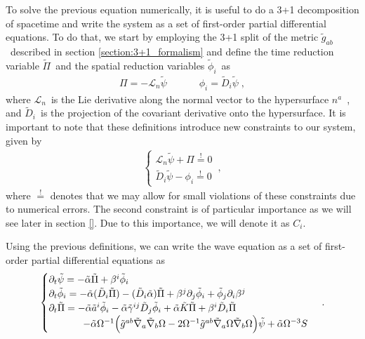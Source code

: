 To solve the previous equation numerically, it is useful to do a 3+1 decomposition of spacetime and write the system as a set of first-order partial differential equations. To do that, we start by employing the 3+1 split of the metric $\tilde{g}_{ab}$~described in section \ref{section:3+1_formalism} and define the time reduction variable $\tilde{\Pi}$~and the spatial reduction variables $\tilde{\phi}_i$~as
%
\begin{align}
    \Pi = - \mathcal{L}_n \tilde{\psi} \;  \quad \quad \quad \phi_i = \tilde{D}_i \tilde{\psi} \; ,
\end{align}
%
where $\mathcal{L}_n$~is the Lie derivative along the normal vector to the hypersurface $n^a$~, and $\tilde{D}_i$~is the projection of the covariant derivative onto the hypersurface. It is important to note that these definitions introduce new constraints to our system, given by
%
\begin{align}
    \begin{cases}
        \mathcal{L}_n \tilde{\psi} + \Pi \overset{!}{=} 0 \\
        \tilde{D}_i \tilde{\psi} - \phi_i \overset{!}{=} 0
    \end{cases}\,,
\end{align}
%
where $\overset{!}{=}$ denotes that we may allow for small violations of these constraints due to numerical errors. The second constraint is of particular importance as we will see later in section \ref{}. Due to this importance, we will denote it as $C_i$.

Using the previous definitions, we can write the wave equation as a set of first-order partial differential equations as
%
\begin{align}
    \begin{cases}
        \partial_t \tilde{\psi} = - \tilde{\alpha} \tilde{\Pi} + \beta^i \tilde{\phi}_i \\
        \partial_t \tilde{\phi}_i = - \tilde{\alpha} (\tilde{D}_i \tilde{\Pi}) - (\tilde{D}_i \tilde{\alpha}) \tilde{\Pi} + \beta^j \partial_j \tilde{\phi}_i + \tilde{\phi}_j \partial_i \beta^j \\
        \partial_t \tilde{\Pi} = - \tilde{\alpha} \tilde{a}^i \tilde{\phi}_i - \tilde{\alpha} \tilde{\gamma}^{ij} \tilde{D}_j \tilde{\phi}_i + \tilde{\alpha} \tilde{K} \tilde{\Pi} + \beta^i \tilde{D}_i \tilde{\Pi} \\
        \hspace{3.5em} - \tilde{\alpha} \Omega^{-1} \Big( \tilde{g}^{ab} \tilde{\nabla}_a \tilde{\nabla}_b \Omega - 2 \Omega^{-1} \tilde{g}^{ab} \tilde{\nabla}_a \Omega \tilde{\nabla}_b \Omega \Big) \tilde{\psi} + \tilde{\alpha} \Omega^{-3} S
    \end{cases}\,.
    \label{eq:wave_equation_3+1}
\end{align}

